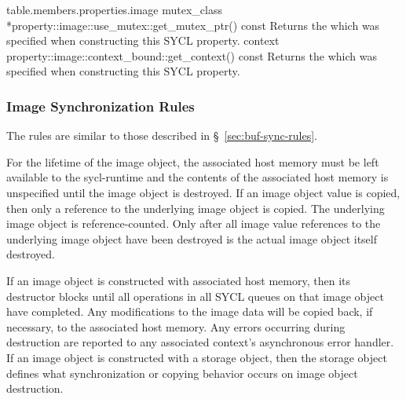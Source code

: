 {table.members.properties.image}
\addRow
{mutex_class *property::image::use_mutex::get_mutex_ptr() const}
{
  Returns the  which was specified when
  constructing this SYCL  property.
}
\addRow
{context property::image::context_bound::get_context() const}
{
  Returns the  which was specified when
  constructing this SYCL  property.
}
\completeTable


\subsubsection{Image Synchronization Rules}
\label{sec:image-sync-rules}

The rules are similar to those described in
\S~\ref{sec:buf-sync-rules}.

For the lifetime of the image object, the associated host memory must
be left available to the \gls{sycl-runtime} and the contents of the associated
host memory is unspecified until the image object is destroyed. If an
image object value is copied, then only a reference to the underlying
image object is copied. The underlying image object is reference-counted.
Only after all image value references to the underlying image object
have been destroyed is the actual image object itself destroyed.

If an image object is constructed with associated host memory, then
its destructor blocks until all operations in all SYCL queues on
that image object have completed. Any modifications to the image data
will be copied back, if necessary, to the associated host memory.
Any errors occurring during destruction are reported to any associated
context's asynchronous error handler. If an image object is constructed
with a storage object, then the storage object defines what
synchronization or copying behavior occurs on image object destruction.



